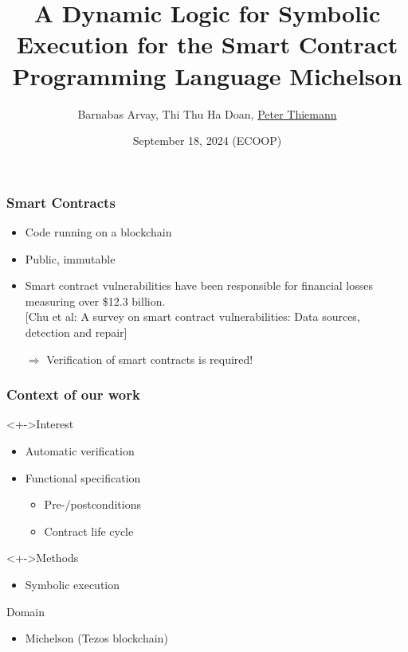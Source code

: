 \documentclass[aspectratio=1610]{beamer}
\title{A Dynamic Logic for Symbolic Execution for the Smart Contract Programming Language Michelson}
\author[Arvay, Doan, Thiemann]{Barnabas Arvay, Thi Thu Ha Doan, \underline{Peter Thiemann}}
\institute[]{University of Freiburg}
\date{September 18, 2024 (ECOOP)}
\begin{document}
\begin{frame}
  \titlepage
\end{frame}

\begin{frame}
  \frametitle{Smart Contracts}
  \begin{itemize}
  \item Code running on a blockchain
  \item Public, immutable
  \item Smart contract vulnerabilities have been responsible for financial losses measuring over \$12.3 billion. \\{}
    [Chu et al: A survey on smart contract vulnerabilities: Data sources, detection and repair]
  \item[$\Rightarrow$] Verification of smart contracts is required!
  \end{itemize}
\end{frame}
\begin{frame}
  \frametitle{Context of our work}
  \begin{block}<+->{Interest}
  \begin{itemize}
  \item Automatic verification
  \item Functional specification
    \begin{itemize}
    \item Pre-/postconditions
    \item Contract life cycle
    \end{itemize}
  \end{itemize}
\end{block}
\begin{block}<+->{Methods}
  \begin{itemize}
  \item Symbolic execution
  \end{itemize}
\end{block}
\begin{block}{Domain}
  \begin{itemize}
  \item Michelson (Tezos blockchain)
  \end{itemize}
\end{block}
\end{frame}
\end{document}
